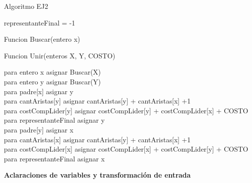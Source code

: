\begin{algorithm}[H] %
 \caption{Algoritmo EJ2}
	representanteFinal = -1 


\end{algorithm}


\begin{algorithm}[H] %
 \caption{Funcion Buscar(entero x)}
\end{algorithm}


\begin{algorithm}[H] %
 \caption{Funcion Unir(enteros X, Y, COSTO)}
 	para entero x asignar Buscar(X)\\
 	para entero y asignar Buscar(Y)\\
	 {
	 	para padre[x] asignar y\\
 	para cantAristas[y] asignar cantAristas[y] + cantAristas[x] +1\\
 	para costCompLider[y] asignar costCompLider[y] + costCompLider[x] + COSTO\\
 	 	 {
            para representanteFinal asignar y\\
        }
	}{ 	 	para padre[y] asignar x\\
 	para cantAristas[x] asignar cantAristas[y] + cantAristas[x] +1\\
 	para costCompLider[x] asignar costCompLider[x] + costCompLider[y] + COSTO\\
 	  {
           para representanteFinal asignar x\\
        }	}
 
\end{algorithm}

\textbf{Aclaraciones de variables y transformaci\'on de entrada}

